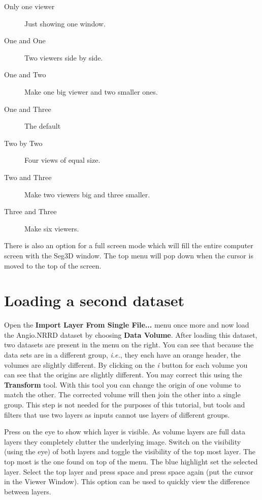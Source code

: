 \documentclass[fleqn,11pt,openany]{book}
\begin{document}
\begin{description}
\item[Only one viewer] Just showing one window.
\item[One and One] Two viewers side by side.
\item[One and Two] Make one big viewer and two smaller ones.
\item[One and Three] The default
\item[Two by Two]  Four views of equal size.
\item[Two and Three] Make two viewers big and three smaller.
\item[Three and Three] Make six viewers.
\end{description}


There is also an option for a full screen mode which will fill the entire computer screen with the Seg3D window. The top menu will pop down when the cursor is moved to the top of the screen.

\section{Loading a second dataset}

Open the {\bf Import Layer From Single File...} menu once more and now load the Angio.NRRD dataset by choosing \textbf {Data Volume}.
After loading this dataset, two datasets are present in the menu on the right.  You can see that because the data sets are in a different group, \emph{i.e.}, they each have an orange header, the volumes are slightly different.  By clicking on the \emph{i} button for each volume you can see that the origins are slightly different.  You may correct this using the {\bf Transform} tool.  With this tool you can change the origin of one volume to match the other. The corrected volume will then join the other into a single group. This step is not needed for  the purposes of this tutorial, but tools and filters that use two layers as inputs cannot use layers of different groups.  

Press on the eye to show which layer is visible. As volume layers are full data layers they completely clutter the underlying image.
Switch on the visibility (using the eye) of both layers and toggle the visibility of the top most layer.  The top most is the one found on top of the menu. 
The blue highlight set the selected layer.  Select the top layer and press space and press space again (put the cursor in the Viewer Window).
This option can be used to quickly view the difference between layers.
\end{document}
